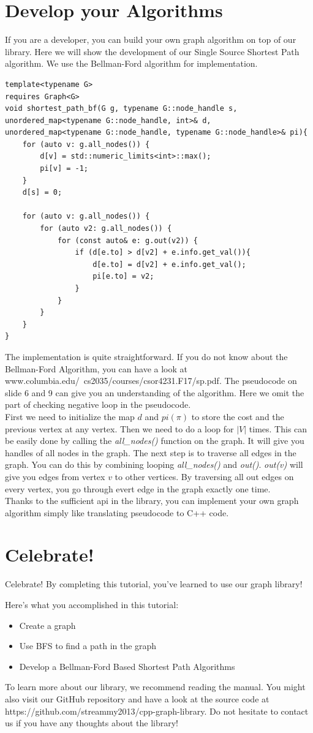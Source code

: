 \documentclass{article}
\begin{document}
    \section {Develop your Algorithms}
If you are a developer, you can build your own graph algorithm on top of our library. Here we will show the development of our Single Source Shortest Path algorithm. We use the Bellman-Ford algorithm for implementation.
\begin{lstlisting}
template<typename G>
requires Graph<G>
void shortest_path_bf(G g, typename G::node_handle s,
unordered_map<typename G::node_handle, int>& d,
unordered_map<typename G::node_handle, typename G::node_handle>& pi){
	for (auto v: g.all_nodes()) {
		d[v] = std::numeric_limits<int>::max();
		pi[v] = -1;
	}
	d[s] = 0;

	for (auto v: g.all_nodes()) {
		for (auto v2: g.all_nodes()) {
			for (const auto& e: g.out(v2)) {
				if (d[e.to] > d[v2] + e.info.get_val()){
					d[e.to] = d[v2] + e.info.get_val();
					pi[e.to] = v2;
				}
			}
		}
	}
}
\end{lstlisting}
The implementation is quite straightforward. If you do not know about the Bellman-Ford Algorithm, you can have a look at www.columbia.edu/~cs2035/courses/csor4231.F17/sp.pdf. The pseudocode on slide 6 and 9 can give you an understanding of the algorithm. Here we omit the part of checking negative loop in the pseudocode.
\\
First we need to initialize the map $d$ and $pi(\pi)$ to store the cost and the previous vertex at any vertex. Then we need to do a loop for $|V|$ times. This can be easily done by calling the \textit{all\_nodes()} function on the graph. It will give you handles of all nodes in the graph. The next step is to traverse all edges in the graph. You can do this by combining looping \textit{all\_nodes()} and \textit{out()}. \textit{out(v)} will give you edges from vertex $v$ to other vertices. By traversing all out edges on every vertex, you go through evert edge in the graph exactly one time.
\\
Thanks to the sufficient api in the library, you can implement your own graph algorithm simply like translating pseudocode to C++ code.

\section{Celebrate!}
Celebrate!
By completing this tutorial, you’ve learned to use our graph library!

Here’s what you accomplished in this tutorial:

    \begin{itemize}
	\item Create a graph
	\item Use BFS to find a path in the graph
	\item Develop a Bellman-Ford Based Shortest Path Algorithms
\end{itemize}

To learn more about our library, we recommend reading the manual. You might also visit our GitHub repository and have a look at the source code at https://github.com/streammy2013/cpp-graph-library. Do not hesitate to contact us if you have any thoughts about the library!
\end{document}
